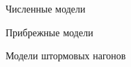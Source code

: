 \begin{chapter}{Численные модели}
\begin{section}{Прибрежные модели}
\begin{paragraph}{Модели штормовых нагонов}



\end{paragraph}
\end{section}


\end{chapter}
